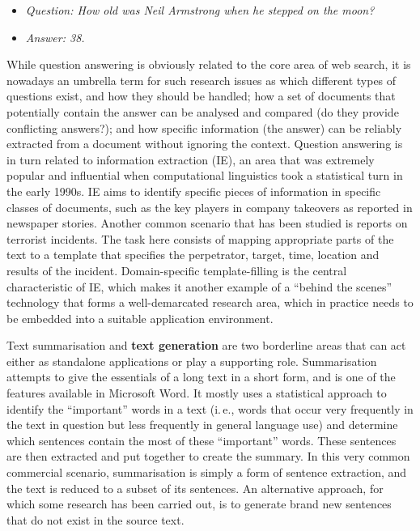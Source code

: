 \documentclass[]{../../metanetpaper}
\begin{document}
\begin{multicols}{2}
\begin{itemize}
\item[] \textit{Question: How old was Neil Armstrong when he stepped on the moon?}
\item[] \textit{Answer: 38.}
\end{itemize}

While question answering is obviously related to the core area of web search, it is nowadays an umbrella term for such research issues as which different types of questions exist, and how they should be handled; how a set of documents that potentially contain the answer can be analysed and compared (do they provide conflicting answers?); and how specific information (the answer) can be reliably extracted from a document without ignoring the context. Question answering is in turn related to information extraction (IE), an area that was extremely popular and influential when computational linguistics took a statistical turn in the early 1990s. IE aims to identify specific pieces of information in specific classes of documents, such as the key players in company takeovers as reported in newspaper stories. Another common scenario that has been studied is reports on terrorist incidents. The task here consists of mapping appropriate parts of the text to a template that specifies the perpetrator, target, time, location and results of the incident. Domain-specific template-filling is the central characteristic of IE, which makes it another example of a “behind the scenes” technology that forms a well-demarcated research area, which in practice needs to be embedded into a suitable application environment.


Text summarisation and \textbf{text generation} are two borderline areas that can act either as standalone applications or play a supporting role. Summarisation attempts to give the essentials of a long text in a short form, and is one of the features available in Microsoft Word. It mostly uses a statistical approach to identify the “important” words in a text (i.\,e., words that occur very frequently in the text in question but less frequently in general language use) and determine which sentences contain the most of these “important” words. These sentences are then extracted and put together to create the summary. In this very common commercial scenario, summarisation is simply a form of sentence extraction, and the text is reduced to a subset of its sentences. An alternative approach, for which some research has been carried out, is to generate brand new sentences that do not exist in the source text.


\end{multicols}
\end{document}
